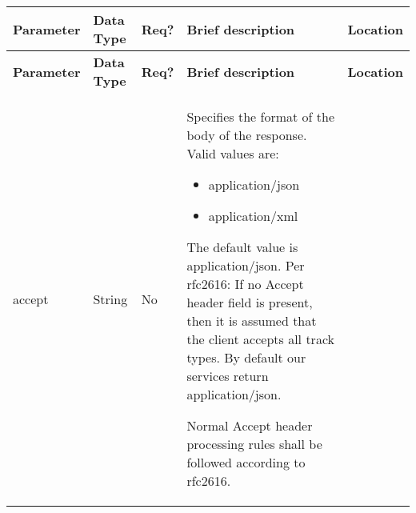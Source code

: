 \begin{longtable}{|>{\raggedright}p{}|>{\raggedright}p{}|>{\raggedright}p{}|>{\raggedright}p{}|>{\raggedright}p{}|}
\hline
\hline 
\textbf{\footnotesize{Parameter }} & \textbf{\footnotesize{Data Type}} & \textbf{\footnotesize{Req?}} & \textbf{\footnotesize{Brief description}} & \textbf{\footnotesize{Location}}\tabularnewline
\hline 
\hline
\endfirsthead
\hline
\hline 
\textbf{\footnotesize{Parameter }} & \textbf{\footnotesize{Data Type}} & \textbf{\footnotesize{Req?}} & \textbf{\footnotesize{Brief description}} & \textbf{\footnotesize{Location}}\tabularnewline
\hline 
\hline
\endhead
\hline 
{\footnotesize{accept}} & {\footnotesize{String}} & {\footnotesize{No}} & {\footnotesize{Specifies the format of the body of the response. Valid
values are: }}{\footnotesize \par}
\begin{itemize}
\item {\footnotesize{application/json}}{\footnotesize \par}
\item {\footnotesize{application/xml}}{\footnotesize \par}
\end{itemize}
{\footnotesize{The default value is application/json. Per rfc2616:
\textquotedbl{}If no Accept header field is present, then it is assumed
that the client accepts all track types.\textquotedbl{} By default
our services return application/json.}}{\footnotesize \par}

{\footnotesize{Normal Accept header processing rules shall be followed
according to rfc2616.}}{\footnotesize \par}


\end{longtable}
